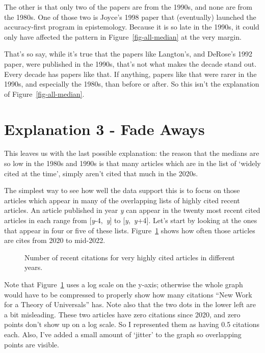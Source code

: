 \documentclass[
  10pt,
  letterpaper,
  DIV=11,
  numbers=noendperiod,
  twoside]{scrartcl}
\begin{document}
The other is that only two of the papers are from the 1990s, and none
are from the 1980s. One of those two is Joyce's 1998 paper that
(eventually) launched the accuracy-first program in epistemology.
Because it is so late in the 1990s, it could only have affected the
pattern in Figure~\ref{fig-all-median} at the very margin.

That's so say, while it's true that the papers like Langton's, and
DeRose's 1992 paper, were published in the 1990s, that's not what makes
the decade stand out. Every decade has papers like that. If anything,
papers like that were rarer in the 1990s, and especially the 1980s, than
before or after. So this isn't the explanation of
Figure~\ref{fig-all-median}.

\section{Explanation 3 - Fade Aways}\label{sec-fade-aways}

This leaves us with the last possible explanation: the reason that the
medians are so low in the 1980s and 1990s is that many articles which
are in the list of `widely cited at the time', simply aren't cited that
much in the 2020s.

The simplest way to see how well the data support this is to focus on
those articles which appear in many of the overlapping lists of highly
cited recent articles. An article published in year \emph{y} can appear
in the twenty most recent cited articles in each range from
{[}\emph{y}-4,~\emph{y}{]} to {[}\emph{y},~\emph{y}+4{]}. Let's start by
looking at the ones that appear in four or five of these lists.
Figure~\ref{fig-four-five-recent} shows how often those articles are
cites from 2020 to mid-2022.

\begin{figure}


\caption{\label{fig-four-five-recent}Number of recent citations for very
highly cited articles in different years.}

\end{figure}%

Note that Figure~\ref{fig-four-five-recent} uses a log scale on the
y-axis; otherwise the whole graph would have to be compressed to
properly show how many citations ``New Work for a Theory of Universals''
has. Note also that the two dots in the lower left are a bit misleading.
These two articles have zero citations since 2020, and zero points don't
show up on a log scale. So I represented them as having 0.5 citations
each. Also, I've added a small amount of `jitter' to the graph so
overlapping points are visible.
\end{document}
